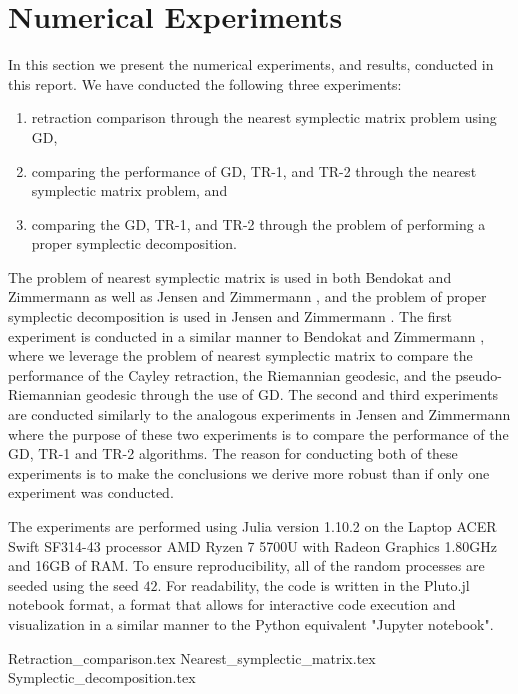 \section{Numerical Experiments}\label{sec:Numerical_experiments}
In this section we present the numerical experiments, and results, conducted in this report. We have conducted the following three experiments: 
\begin{enumerate}
    \item retraction comparison through the nearest symplectic matrix problem using GD, 
    \item comparing the performance of GD, TR-1, and TR-2 through the nearest symplectic matrix problem, and 
    \item comparing the GD, TR-1, and TR-2 through the problem of performing a proper symplectic decomposition.
\end{enumerate}
The problem of nearest symplectic matrix is used in both Bendokat and Zimmermann \cite[p.~25]{BendokatZimmermann2021} as well as Jensen and Zimmermann \cite[p.~15]{JensenZimmermann2024}, and the problem of proper symplectic decomposition is used in Jensen and Zimmermann \cite[p.~17]{JensenZimmermann2024}. The first experiment is conducted in a similar manner to Bendokat and Zimmermann \cite[p.~25]{BendokatZimmermann2021}, where we leverage the problem of nearest symplectic matrix to compare the performance of the Cayley retraction, the Riemannian geodesic, and the pseudo-Riemannian geodesic through the use of GD. The second and third experiments are conducted similarly to the analogous experiments in Jensen and Zimmermann \cite[p.~15~\&~17]{JensenZimmermann2024} where the purpose of these two experiments is to compare the performance of the GD, TR-1 and TR-2 algorithms. The reason for conducting both of these experiments is to make the conclusions we derive more robust than if only one experiment was conducted. 

The experiments are performed using Julia version 1.10.2 on the Laptop ACER Swift SF314-43 processor AMD Ryzen 7 5700U with Radeon Graphics 1.80GHz and 16GB of RAM. To ensure reproducibility, all of the random processes are seeded using the seed $42$. For readability, the code is written in the Pluto.jl notebook format, a format that allows for interactive code execution and visualization in a similar manner to the Python equivalent "Jupyter notebook". 

{Retraction_comparison.tex}
{Nearest_symplectic_matrix.tex}
{Symplectic_decomposition.tex}
